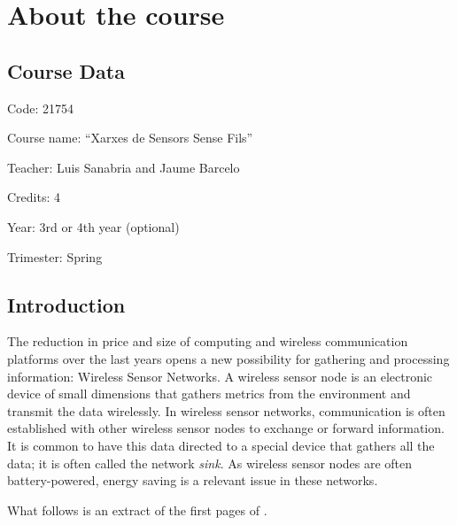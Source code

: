 \chapter{About the course}

\section{Course Data}

Code: 21754

Course name: ``Xarxes de Sensors Sense Fils''

Teacher: Luis Sanabria and Jaume Barcelo

Credits: 4

Year: 3rd or 4th year (optional)

Trimester: Spring

\section{Introduction}
The reduction in price and size of computing and wireless communication platforms over the last years opens a new possibility for gathering and processing information: Wireless Sensor Networks.
A wireless sensor node is an electronic device of small dimensions that gathers metrics from the environment and transmit the data wirelessly.
In wireless sensor networks, communication is often established with other wireless sensor nodes to exchange or forward information.
It is common to have this data directed to a special device that gathers all the data; it is often called the network \emph{sink}.
As wireless sensor nodes are often battery-powered, energy saving is a relevant issue in these networks.

What follows is an extract of the first pages of \cite{sanabria2012lpw}.

